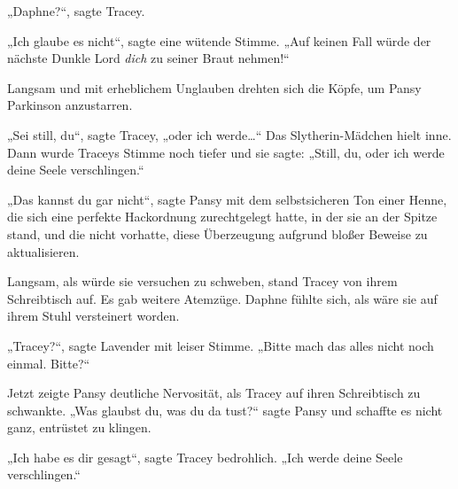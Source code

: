 „Daphne?“, sagte Tracey.

„Ich glaube es nicht“, sagte eine wütende Stimme. „Auf keinen Fall würde der nächste Dunkle Lord \emph{dich} zu seiner Braut nehmen!“

Langsam und mit erheblichem Unglauben drehten sich die Köpfe, um Pansy Parkinson anzustarren.

„Sei still, du“, sagte Tracey, „oder ich werde…“ Das Slytherin-Mädchen hielt inne. Dann wurde Traceys Stimme noch tiefer und sie sagte: „Still, du, oder ich werde deine Seele verschlingen.“

„Das kannst du gar nicht“, sagte Pansy mit dem selbstsicheren Ton einer Henne, die sich eine perfekte Hackordnung zurechtgelegt hatte, in der sie an der Spitze stand, und die nicht vorhatte, diese Überzeugung aufgrund bloßer Beweise zu aktualisieren.

Langsam, als würde sie versuchen zu schweben, stand Tracey von ihrem Schreibtisch auf. Es gab weitere Atemzüge. Daphne fühlte sich, als wäre sie auf ihrem Stuhl versteinert worden.

„Tracey?“, sagte Lavender mit leiser Stimme. „Bitte mach das alles nicht noch einmal. Bitte?“

Jetzt zeigte Pansy deutliche Nervosität, als Tracey auf ihren Schreibtisch zu schwankte. „Was glaubst du, was du da tust?“ sagte Pansy und schaffte es nicht ganz, entrüstet zu klingen.

„Ich habe es dir gesagt“, sagte Tracey bedrohlich. „Ich werde deine Seele verschlingen.“

